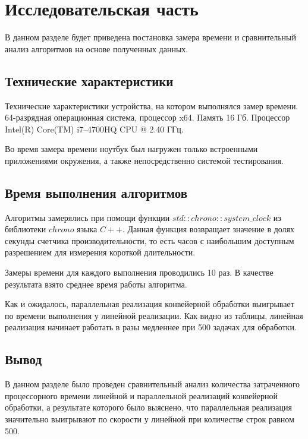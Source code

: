 \chapter{Исследовательская часть}

В данном разделе будет приведена постановка замера времени и сравнительный анализ алгоритмов на основе полученных данных.

\section{Технические характеристики}

Технические характеристики устройства, на котором выполнялся замер времени.
64-разрядная операционная система, процессор x64. Память 16 Гб. Процессор Intel(R) Core(TM) i7--4700HQ CPU @ 2.40 ГГц.

Во время замера времени ноутбук был нагружен только встроенными приложениями окружения, а также непосредственно системой тестирования.

\section{Время выполнения алгоритмов}

Алгоритмы замерялись при помощи функции $std::chrono::system\_clock$ из библиотеки $chrono$ языка $C++$. Данная функция возвращает значение в долях секунды счетчика производительности, то есть часов с наибольшим доступным разрешением для измерения короткой длительности.

Замеры времени для каждого выполнения проводились 10 раз. В качестве результата взято среднее время работы алгоритма.

\newpage
{}
\newpage
{}
\newpage
Как и ожидалось, параллельная реализация конвейерной обработки выигрывает по времени выполнения у линейной реализации. Как видно из таблицы, линейная реализация начинает работать в разы медленнее при 500 задачах для обработки.\\

\newpage
\section*{Вывод}

В данном разделе было проведен сравнительный анализ количества затраченного процессорного времени линейной и параллельной реализаций конвейерной обработки, а результате которого было выяснено, что параллельная реализация значительно выигрывают по скорости у линейной при количестве строк равном 500.

